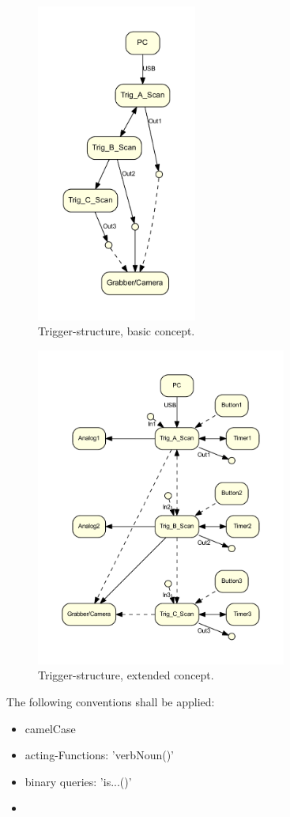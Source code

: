		\begin{figure}[ht]
			\centering
			\includegraphics[height=105mm]{src/_Octane_Trigger_basic.pdf}
			\caption{Trigger-structure, basic concept.}
			\label{_Octane_Trigger_basic}
		\end{figure}
		\begin{figure}[ht]
			\centering
			\includegraphics[height=105mm]{src/_Octane_Trigger_extended_neato.pdf}
			\caption{Trigger-structure, extended concept.}
			\label{_Octane_Trigger_extended_kfdp}
		\end{figure}

	{	The following conventions shall be applied:
		\begin{itemize} \setlength\itemsep{1px}
		\item camelCase
		\item acting-Functions: 'verbNoun()'
		\item binary queries: 'is...()'
		\item 
		\end{itemize}
	}

